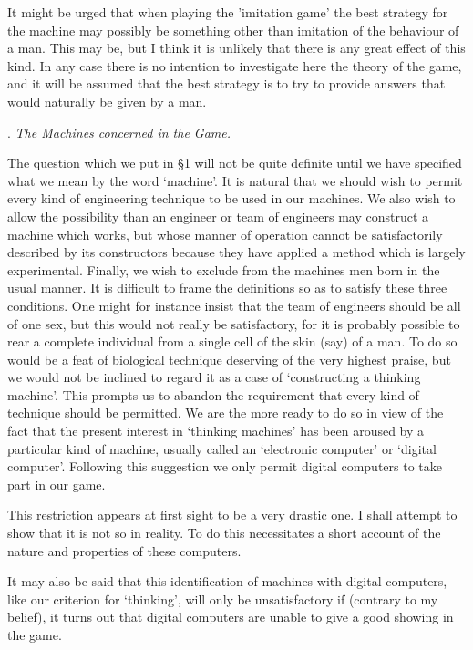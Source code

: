 \documentclass[10pt]{article} %
\begin{document}
It might be urged that when playing the 'imitation game' the best strategy for the machine may possibly be something other than imitation of the behaviour of a man. This may be, but I think it is unlikely that there is any great effect of this kind. In any case there is no intention to investigate here the theory of the game, and it will be assumed that the best strategy is to try to provide answers that would naturally be given by a man. 

\vspace{0.5\baselineskip} %
\noindent{}. \textit{The Machines concerned in the Game.}
\vspace{0.5\baselineskip} %

The question which we put in \S 1 will not be quite definite until we have specified what we mean by the word `machine'. It is natural that we should wish to permit every kind of engineering technique to be used in our machines. We also wish to allow the possibility than an engineer or team of engineers may construct a machine which works, but whose manner of operation cannot be satisfactorily described by its constructors because they have applied a method which is largely experimental. Finally, we wish to exclude from the machines men born in the usual manner. It is difficult to frame the definitions so as to satisfy these three conditions. One might for instance insist that the team of engineers should be all of one sex, but this would not really be satisfactory, for it is probably possible to rear a complete individual from a single cell of the skin (say) of a man. To do so would be a feat of biological technique deserving of the very highest praise, but we would not be inclined to regard it as a case of `constructing a thinking machine'. This prompts us to abandon the requirement that every kind of technique should be permitted. We are the more ready to do so in view of the fact that the present interest in `thinking machines' has been aroused by a particular kind of machine, usually called an `electronic computer' or `digital computer'. Following this suggestion we only permit digital computers to take part in our game.

This restriction appears at first sight to be a very drastic one. I shall attempt to show that it is not so in reality. To do this necessitates a short account of the nature and properties of these computers.

It may also be said that this identification of machines with digital computers, like our criterion for `thinking', will only be unsatisfactory if (contrary to my belief), it turns out that digital computers are unable to give a good showing in the game.
\end{document}
